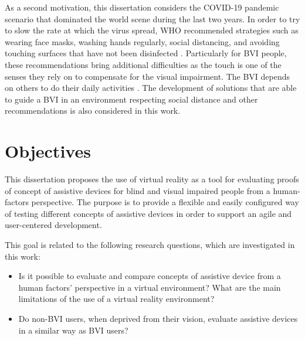 
As a second motivation, this dissertation considers the COVID-19 pandemic scenario that dominated the world scene during the last two years. In order to try to slow the rate at which the virus spread, WHO recommended strategies such as wearing face masks, washing hands regularly, social distancing, and avoiding touching surfaces that have not been disinfected \cite{who_2020}. Particularly for BVI people, these recommendations bring additional difficulties as the touch is one of the senses they rely on to compensate for the visual impairment. %
The BVI depends on others to do their daily activities \cite{jondani2021strategies}. The development of solutions that are able to guide a BVI in an environment respecting social distance and other recommendations is also considered in this work.

\section{Objectives}
\label{sec:objetivos}


 This dissertation proposes the use of virtual reality as a tool for evaluating proofs of concept of assistive devices for blind and visual impaired people from a human-factors perspective. The purpose is to provide a flexible and easily configured way of testing different concepts of assistive devices in order to support an agile and user-centered development.

 This goal is related to the following research questions, which are investigated in this work:

 \begin{itemize}
    \item Is it possible to evaluate and compare concepts of assistive device from a human factors’ perspective in a virtual environment? What are the main limitations of the use of a virtual reality environment? \label{itm:obj_first}
    \item Do non-BVI users, when deprived from their vision, evaluate assistive devices in a similar way as BVI users? \label{itm:obj_second}
\end{itemize}
 
